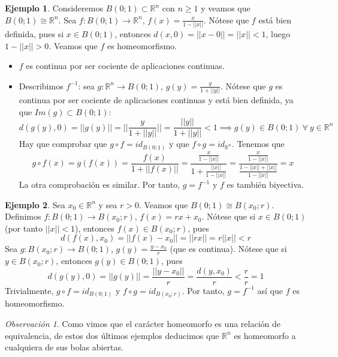 \documentclass[12pt]{report}
\theoremstyle{definition}
\theoremstyle{definition}
\newtheorem{example}{Ejemplo}[chapter]
\theoremstyle{remark}
\newtheorem*{obs}{Observación} %
\newcommand{\R}{\mathbb R}
\begin{document}
\begin{example}
Consideremos $B(0;1) \subset \R^n$ con $n \geq 1$ y veamos que $B(0;1) \cong \R^n$. Sea $f \colon B(0;1) \to \R^n$, $f(x) = \frac{x}{1-||x||}$. Nótese que $f$ está bien definida, pues si $x \in B(0;1)$, entonces $d(x,0) = ||x-0|| = ||x|| < 1$, luego $1-||x|| > 0$. Veamos que $f$ es homeomorfismo.
\begin{itemize}
    \item $f$ es continua por ser cociente de aplicaciones continuas.
    \item Describimos $f^{-1}$: sea $g \colon \R^n \to B(0;1)$, $g(y) = \frac{y}{1+||y||}$. Nótese que $g$ es continua por ser cociente de aplicaciones continuas y está bien definida, ya que $Im(g) \subset B(0;1)$: \[d(g(y),0) = ||g(y)|| = ||\frac{y}{1+||y||}|| = \frac{||y||}{1+||y||} < 1 \implies g(y) \in B(0;1) \ \forall \ y \in \R^n\]
    Hay que comprobar que $g \circ f = id_{B(0;1)}$ y que $f \circ g = id_{\R^n}$. Tenemos que \[g \circ f(x) = g(f(x)) = \frac{f(x)}{1+||f(x)||} = \frac{\frac{x}{1-||x||}}{1+\frac{||x||}{1-||x||}} = \frac{\frac{x}{1-||x||}}{\frac{1-||x||+||x||}{1-||x||}} = x\]
    La otra comprobación es similar. Por tanto, $g = f^{-1}$ y $f$ es también biyectiva.
\end{itemize}
\end{example}

\begin{example}
Sea $x_0 \in \R^n$ y sea $r > 0$. Veamos que $B(0;1) \cong B(x_0;r)$. Definimos $f \colon B(0;1) \to B(x_0;r)$, $f(x) = rx + x_0$. Nótese que si $x \in B(0;1)$ (por tanto $||x||<1$), entonces $f(x) \in B(x_0;r)$, pues \[d(f(x),x_0) = ||f(x) - x_0|| = ||rx|| = r||x|| < r\] Sea $g \colon B(x_0;r) \to B(0;1)$, $g(y) = \frac{y-x_0}{r}$ (que es continua). Nótese que si $y \in B(x_0;r)$, entonces $g(y) \in B(0;1)$, pues \[d(g(y),0) = ||g(y)|| = \frac{||y-x_0||}{r} = \frac{d(y,x_0)}{r} < \frac{r}{r} = 1\] Trivialmente, $g \circ f = id_{B(0;1)}$ y $f \circ g = id_{B(x_0;r)}$. Por tanto, $g = f^{-1}$ así que $f$ es homeomorfismo.
\end{example}

\begin{obs}
Como vimos que el carácter homeomorfo es una relación de equivalencia, de estos dos últimos ejemplos deducimos que $\R^n$ es homeomorfo a cualquiera de sus bolas abiertas.
\end{obs}
\end{document}
